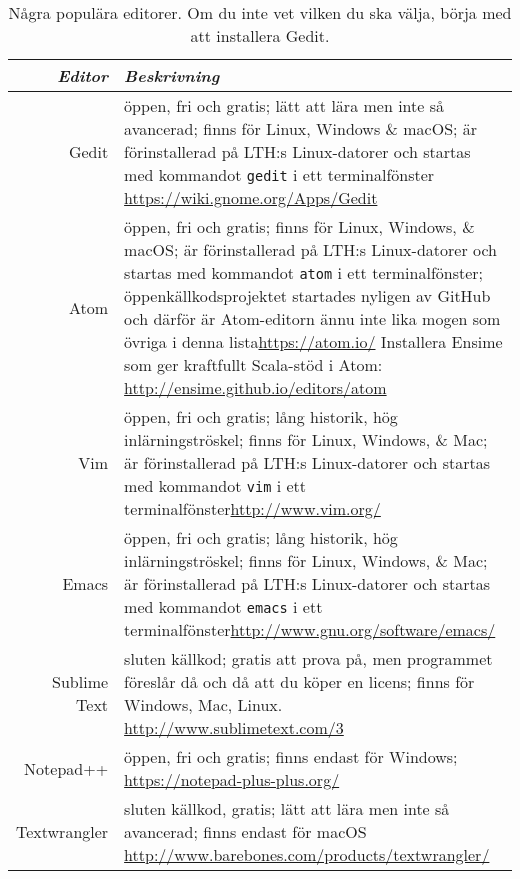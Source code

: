 \begin{table}[t]

\renewcommand{\arraystretch}{1.25}

\begin{tabular}{@{}r | p{}}
\textit{Editor} & \textit{Beskrivning} \\ \hline

Gedit & öppen, fri och gratis; lätt att lära men inte så avancerad; finns för Linux, Windows \& macOS; är förinstallerad på LTH:s Linux-datorer och startas med kommandot \verb+gedit+ i ett terminalfönster\newline  
 \url{https://wiki.gnome.org/Apps/Gedit} \\

Atom & öppen, fri och gratis; finns för Linux, Windows, \& macOS; är förinstallerad på LTH:s Linux-datorer och startas med kommandot \verb+atom+ i ett terminalfönster; öppenkällkodsprojektet startades nyligen av GitHub och därför är Atom-editorn ännu inte lika mogen som övriga i denna lista\newline \url{https://atom.io/} \newline 
Installera Ensime som ger kraftfullt Scala-stöd i Atom: \newline \url{http://ensime.github.io/editors/atom}\\


Vim & öppen, fri och gratis; lång historik, hög inlärningströskel; finns för Linux, Windows, \& Mac; är förinstallerad på LTH:s Linux-datorer och startas med kommandot \verb+vim+ i ett terminalfönster\newline \url{http://www.vim.org/} \\

Emacs & öppen, fri och gratis; lång historik, hög inlärningströskel; finns för Linux, Windows, \& Mac; är förinstallerad på LTH:s Linux-datorer och startas med kommandot \verb+emacs+ i ett terminalfönster\newline \url{http://www.gnu.org/software/emacs/} \\

Sublime Text& sluten källkod; gratis att prova på, men programmet föreslår då och då att du köper en licens; finns för Windows, Mac, Linux. \newline
 \url{http://www.sublimetext.com/3} \\


Notepad++ & öppen, fri och gratis; finns endast för Windows; \newline \url{https://notepad-plus-plus.org/} \\


Textwrangler & sluten källkod, gratis; lätt att lära men inte så avancerad; finns endast för macOS  
\newline \url{http://www.barebones.com/products/textwrangler/} \\

\end{tabular}
    \caption{Några populära editorer. Om du inte vet vilken du ska välja, börja med att installera Gedit.}
    \label{edit:popular-editors}
\end{table}